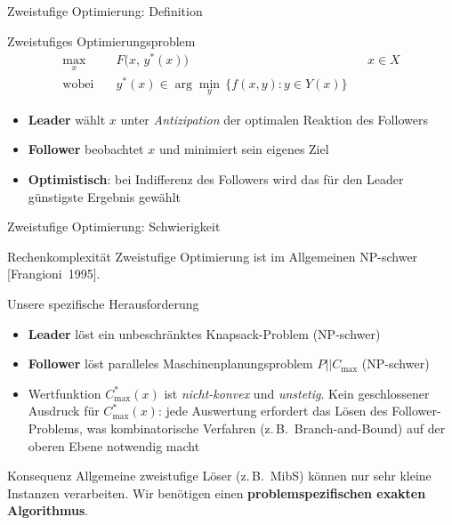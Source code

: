 \documentclass[fleqn,11pt,aspectratio=43]{beamer}
\newcommand{\Cmax}{C_{\max}}
\newcommand{\Copt}{C_{\max}^{*}}
\begin{document}
\begin{frame}[shrink=5]{Zweistufige Optimierung: Definition}
  \begin{block}{Zweistufiges Optimierungsproblem}
    \vspace{-0.3em}
    \begin{align*}
      \max_{x}\quad & F\bigl(x,\,y^*(x)\bigr) & &x\in X\\
      \text{wobei}\quad & y^*(x)\in\arg\min_{y}\,\{f(x,y):y\in Y(x)\}
    \end{align*}
    \vspace{-0.4em}
  \end{block}
  \begin{itemize}
    \item \textbf{Leader} wählt $x$ unter \emph{Antizipation} der optimalen Reaktion des Followers
    \item \textbf{Follower} beobachtet $x$ und minimiert sein eigenes Ziel
    \item \textbf{Optimistisch}: bei Indifferenz des Followers wird das für den Leader günstigste Ergebnis gewählt
  \end{itemize}
\end{frame}

\begin{frame}[shrink=22]{Zweistufige Optimierung: Schwierigkeit}
  \begin{alertblock}{Rechenkomplexität}
    Zweistufige Optimierung ist im Allgemeinen NP-schwer [Frangioni~1995].
  \end{alertblock}
  \begin{block}{Unsere spezifische Herausforderung}
    \begin{itemize}
      \item \textbf{Leader} löst ein unbeschränktes Knapsack-Problem (NP-schwer)
      \item \textbf{Follower} löst paralleles Maschinenplanungsproblem $P||\Cmax$ (NP-schwer)
      \item Wertfunktion $\Copt(x)$ ist \emph{nicht-konvex} und \emph{unstetig}.
      Kein geschlossener Ausdruck für $\Copt(x)$: jede Auswertung erfordert das Lösen des Follower-Problems, was kombinatorische Verfahren (z.\,B.\ Branch-and-Bound) auf der oberen Ebene notwendig macht
    \end{itemize}
  \end{block}
  \begin{block}{Konsequenz}
    Allgemeine zweistufige Löser (z.\,B.\ MibS) können nur sehr kleine Instanzen verarbeiten.
    Wir benötigen einen \textbf{problemspezifischen exakten Algorithmus}.
  \end{block}
\end{frame}
\end{document}
